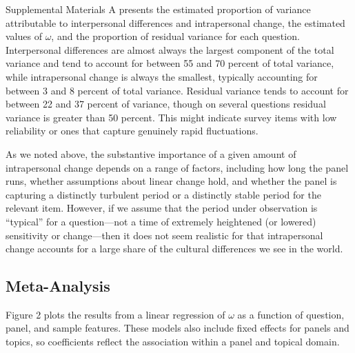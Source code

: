 \documentclass[
  12pt,
]{article}
\begin{document}
Supplemental Materials A presents the estimated proportion of variance
attributable to interpersonal differences and intrapersonal change, the
estimated values of \(\omega\), and the proportion of residual variance
for each question. Interpersonal differences are almost always the
largest component of the total variance and tend to account for between
55 and 70 percent of total variance, while intrapersonal change is
always the smallest, typically accounting for between 3 and 8 percent of
total variance. Residual variance tends to account for between 22 and 37
percent of variance, though on several questions residual variance is
greater than 50 percent. This might indicate survey items with low
reliability or ones that capture genuinely rapid fluctuations.

As we noted above, the substantive importance of a given amount of
intrapersonal change depends on a range of factors, including how long
the panel runs, whether assumptions about linear change hold, and
whether the panel is capturing a distinctly turbulent period or a
distinctly stable period for the relevant item. However, if we assume
that the period under observation is ``typical'' for a question---not a
time of extremely heightened (or lowered) sensitivity or change---then
it does not seem realistic for that intrapersonal change accounts for a
large share of the cultural differences we see in the world.

\hypertarget{meta-analysis}{%
\subsection{Meta-Analysis}\label{meta-analysis}}

Figure 2 plots the results from a linear regression of \(\omega\) as a
function of question, panel, and sample features. These models also
include fixed effects for panels and topics, so coefficients reflect the
association within a panel and topical domain.
\end{document}
